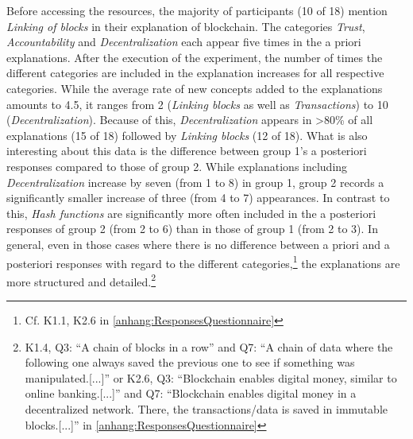 Before accessing the resources, the majority of participants (10 of 18) mention \textit{Linking of blocks} in their explanation of blockchain. The categories \textit{Trust}, \textit{Accountability} and \textit{Decentralization} each appear five times in the a priori explanations. After the execution of the experiment, the number of times the different categories are included in the explanation increases for all respective categories. While the average rate of new concepts added to the explanations amounts to 4.5, it ranges from 2 (\textit{Linking blocks} as well as \textit{Transactions}) to 10 (\textit{Decentralization}). Because of this, \textit{Decentralization} appears in >80\% of all explanations (15 of 18) followed by \textit{Linking blocks} (12 of 18).
What is also interesting about this data is the difference between group 1's a posteriori responses compared to those of group 2. While explanations including \textit{Decentralization} increase by seven (from 1 to 8) in group 1, group 2 records a significantly smaller increase of three (from 4 to 7) appearances. In contrast to this, \textit{Hash functions} are significantly more often included in the a posteriori responses of group 2 (from 2 to 6) than in those of group 1 (from 2 to 3). In general, even in those cases where there is no difference between a priori and a posteriori responses with regard to the different categories,\footnote{Cf. K1.1, K2.6 in \ref{anhang:ResponsesQuestionnaire}} the explanations are more structured and detailed.\footnote{K1.4, Q3: \enquote{A chain of blocks in a row} and Q7: \enquote{A chain of data where the following one always saved the previous one to see if something was manipulated.[...]} or K2.6, Q3: \enquote{Blockchain enables digital money, similar to online banking.[...]} and Q7: \enquote{Blockchain enables digital money in a decentralized network. There, the transactions/data is saved in immutable blocks.[...]} in \ref{anhang:ResponsesQuestionnaire}}

\setlength\dashlinedash{0.2pt}
\setlength\dashlinegap{1.5pt}
\setlength\arrayrulewidth{0.3pt}

